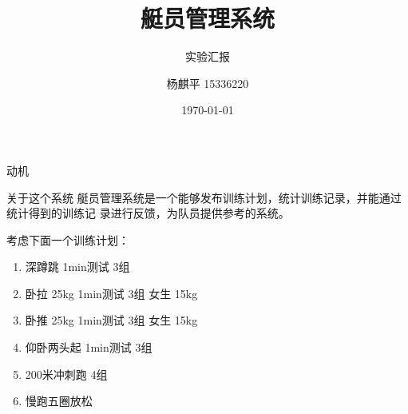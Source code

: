 \documentclass{beamer}
\title{艇员管理系统}
\subtitle{实验汇报}
\author{杨麒平 15336220}
\institute{rowing crew}
\date{\today}
\begin{document}

\begin{frame}
  \titlepage
\end{frame}

\begin{frame}{动机}
   {
    \begin{block}{关于这个系统}
    艇员管理系统是一个能够发布训练计划，统计训练记录，并能通过统计得到的训练记
    录进行反馈，为队员提供参考的系统。
  \end{block}


    考虑下面一个训练计划：

  \begin{enumerate}
  \item {深蹲跳 1min测试 3组}
  \item {卧拉 25kg 1min测试 3组 女生 15kg}
  \item {卧推 25kg 1min测试 3组 女生 15kg}
  \item {仰卧两头起 1min测试 3组}
  \item {200米冲刺跑 4组}
  \item {慢跑五圈放松}
  \end{enumerate}}

   {
      

}
\end{frame}
\end{document}

